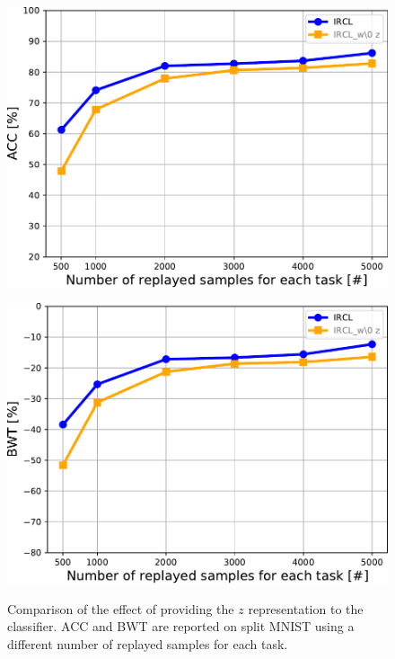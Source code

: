 \documentclass[letterpaper]{article} %
\begin{document}
\begin{figure}[ht]
\centering
\includegraphics[width=0.7200000000000001\linewidth,height=3.5in ]{pic/w_wo_z_acc_mnist.pdf}\\
\includegraphics[width=0.8\linewidth]{pic/w_wo_z_bwt_mnist.pdf}
\caption{Comparison of the effect of providing the $z$ representation to the classifier. ACC and BWT are reported on split MNIST using a different number of replayed samples for each task.}
\label{z_with_conditioning_mnist}
\end{figure}
\end{document}

